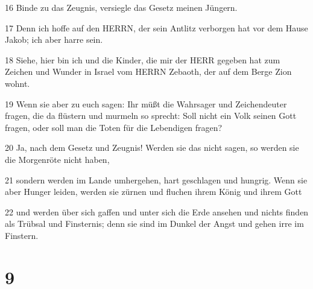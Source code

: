 \par 16 Binde zu das Zeugnis, versiegle das Gesetz meinen Jüngern.
\par 17 Denn ich hoffe auf den HERRN, der sein Antlitz verborgen hat vor dem Hause Jakob; ich aber harre sein.
\par 18 Siehe, hier bin ich und die Kinder, die mir der HERR gegeben hat zum Zeichen und Wunder in Israel vom HERRN Zebaoth, der auf dem Berge Zion wohnt.
\par 19 Wenn sie aber zu euch sagen: Ihr müßt die Wahrsager und Zeichendeuter fragen, die da flüstern und murmeln so sprecht: Soll nicht ein Volk seinen Gott fragen, oder soll man die Toten für die Lebendigen fragen?
\par 20 Ja, nach dem Gesetz und Zeugnis! Werden sie das nicht sagen, so werden sie die Morgenröte nicht haben,
\par 21 sondern werden im Lande umhergehen, hart geschlagen und hungrig. Wenn sie aber Hunger leiden, werden sie zürnen und fluchen ihrem König und ihrem Gott
\par 22 und werden über sich gaffen und unter sich die Erde ansehen und nichts finden als Trübsal und Finsternis; denn sie sind im Dunkel der Angst und gehen irre im Finstern.

\chapter{9}

